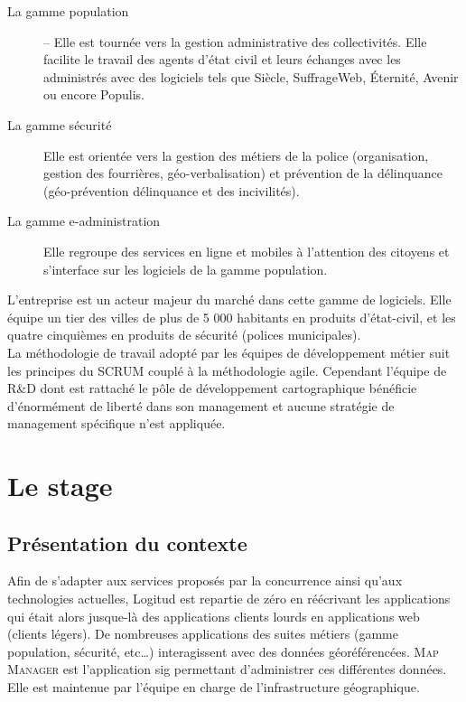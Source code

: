 \documentclass{rapportUHA40}
\begin{document}
\begin{description}
  \item[La gamme population] – Elle est tournée vers la gestion administrative des
    collectivités. Elle facilite le travail des agents d'état civil et leurs
    échanges avec les administrés avec des logiciels tels que Siècle, SuffrageWeb,
    Éternité, Avenir ou encore Populis.
  \item[La gamme sécurité] Elle est orientée vers la gestion des métiers de la police
    (organisation, gestion des fourrières, géo-verbalisation) et prévention de la
    délinquance (géo-prévention délinquance et des incivilités).
  \item[La gamme e-administration] Elle regroupe des services en ligne et mobiles à
    l'attention des citoyens et s'interface sur les logiciels de la gamme
    population.
\end{description}

L'entreprise est un acteur majeur du marché dans cette gamme de logiciels. Elle
équipe un tier des villes de plus de 5 000 habitants en produits d’état-civil,
et les quatre cinquièmes en produits de sécurité (polices municipales).\\

La méthodologie de travail adopté par les équipes de développement métier suit
les principes du \gls{SCRUM} couplé à la méthodologie \Gls{agile}. Cependant
l'équipe de R\&D dont est rattaché le pôle de développement cartographique
bénéficie d'énormément de liberté dans son management et aucune stratégie de
management spécifique n'est appliquée.

\newpage
\section{Le stage}
\subsection{Présentation du contexte}

Afin de s'adapter aux services proposés par la concurrence ainsi qu'aux
technologies actuelles, Logitud est repartie de zéro en réécrivant les
applications qui était alors jusque-là des applications clients lourds en
applications web (clients légers). De nombreuses applications des suites
métiers (gamme population, sécurité, etc\ldots) interagissent avec des données
géoréférencées. \textsc{Map Manager} est l'application \gls{sig} permettant
d’administrer ces différentes données. Elle est maintenue par l’équipe en
charge de l’infrastructure géographique.
\end{document}
